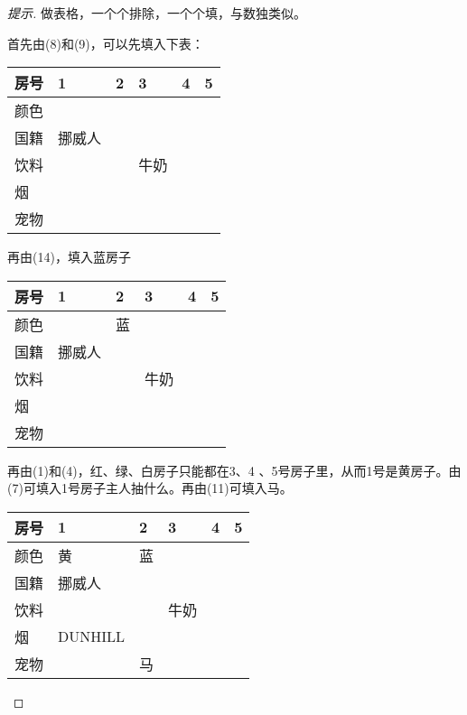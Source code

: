 \begin{proof}[提示]
  做表格，一个个排除，一个个填，与数独类似。

  首先由(8)和(9)，可以先填入下表：
    \begin{center}
      \renewcommand*{\arraystretch}{1.0}
      \begin{tabular}{l|l|l|l|l|l}
        \hline
        房号     & 1      & 2 & 3    & 4 & 5\\\hline
        颜色     &        &   &      &   &  \\\hline
        国籍     & 挪威人 &   &      &   &  \\\hline
        饮料     &        &   & 牛奶 &   &  \\\hline
        烟       &        &   &      &   &  \\
        宠物     &        &   &      &   &  \\
        \hline
      \end{tabular}
    \end{center}

    再由(14)，填入蓝房子
    \begin{center}
      \renewcommand*{\arraystretch}{1.0}
      \begin{tabular}{l|l|l|l|l|l}
        \hline
        房号     & 1      & 2  & 3    & 4 & 5\\\hline
        颜色     &        & 蓝 &      &   &  \\\hline
        国籍     & 挪威人 &    &      &   &  \\\hline
        饮料     &        &    & 牛奶 &   &  \\\hline
        烟       &        &    &      &   &  \\\hline
        宠物     &        &    &      &   &  \\
        \hline
      \end{tabular}
    \end{center}

    再由(1)和(4)，红、绿、白房子只能都在3、4 、5号房子里，从而1号是黄房子。由(7)可填入1号房子主人抽什么。再由(11)可填入马。
    \begin{center}
      \renewcommand*{\arraystretch}{1.0}
      \begin{tabular}{l|l|l|l|l|l}
        \hline
        房号     & 1      & 2  & 3    & 4 & 5\\\hline
        颜色     & 黄     & 蓝 &      &   &  \\\hline
        国籍     & 挪威人 &    &      &   &  \\\hline
        饮料     &        &    & 牛奶 &   &  \\\hline
        烟       & DUNHILL&    &      &   &  \\\hline
        宠物     &        & 马 &      &   &  \\
        \hline
      \end{tabular}
    \end{center}


\end{proof}
